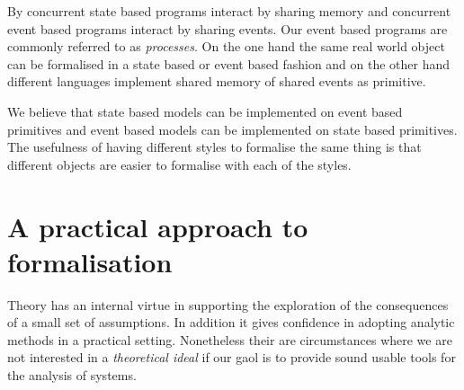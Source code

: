 \documentclass[]{article}
\begin{document}
By concurrent state based programs interact by sharing memory and concurrent event based programs interact by sharing events. Our event based programs  are commonly referred to as \emph{processes}. On the one hand the same real world object  can be formalised  in a state based or event based fashion and on the other hand different languages implement shared memory of shared events as primitive.

We believe that state based models can be implemented on event based primitives and event based models can be implemented on state based primitives.  The usefulness of having different styles to formalise the same thing is that different  objects are easier to formalise with each of the styles.

\section{A practical  approach to formalisation}
Theory has an internal virtue in  supporting the exploration of the consequences of a small set of assumptions. In addition it gives confidence in adopting analytic methods in a practical setting.  Nonetheless their are circumstances where  we are not interested in a \emph{theoretical ideal} if our gaol is to provide sound usable tools for the analysis of systems.
\end{document}

